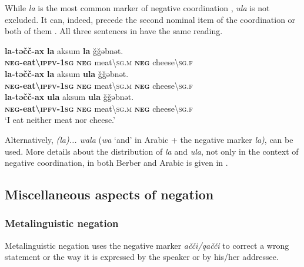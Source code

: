 \documentclass[output=paper,colorlinks,citecolor=brown]{langscibook}
\begin{document}
While \textit{la} is the most common marker of negative coordination , \textit{ula} is not excluded. It can, indeed, precede the second nominal item of the coordination  or both of them .
All three sentences in  have the same reading.

\ea\label{ex:siw:74}
    \ea\label{ex:siw:74a}
        \gll \textbf{la-təčč-ax} \textbf{la} aksum \textbf{la} ǧǧəbnət. \\ 
             \textbf{\textsc{neg}-eat{\textbackslash}\textsc{ipfv-1sg}} \textbf{\textsc{neg}} meat{\textbackslash}\textsc{sg.m} \textbf{\textsc{neg}} cheese{\textbackslash}\textsc{sg.f} \\
    \ex\label{ex:siw:74b}
        \gll \textbf{la-təčč-ax} \textbf{la} aksum \textbf{ula} ǧǧəbnət. \\
             \textbf{\textsc{neg}-eat{\textbackslash}\textsc{ipfv-1sg}} \textbf{\textsc{neg}} meat{\textbackslash}\textsc{sg.m} \textbf{\textsc{neg}} cheese{\textbackslash}\textsc{sg.f} \\
    \ex\label{ex:siw:74c}
        \gll \textbf{la-təčč-ax} \textbf{ula} aksum \textbf{ula} ǧǧəbnət. \\
             \textbf{\textsc{neg}-eat{\textbackslash}\textsc{ipfv-1sg}} \textbf{\textsc{neg}} meat{\textbackslash}\textsc{sg.m} \textbf{\textsc{neg}} cheese{\textbackslash}\textsc{sg.f} \\
        \glt ‘I eat neither meat nor cheese.’
    \z
\z 

Alternatively, \textit{(la)... wala} (\textit{wa} ‘and’ in Arabic + the negative marker \textit{la)}, can be used. More details about the distribution of \textit{la} and \textit{ula}, not only in the context of negative coordination, in both Berber and Arabic is given in .

\subsection{Miscellaneous aspects of negation}\label{sec:siw:4.6}
\subsubsection{Metalinguistic negation}\label{sec:siw:4.6.1}

Metalinguistic negation uses the negative marker \textit{ačči/qačči} to correct a wrong statement or the way it is expressed by the speaker or by his/her addressee.
\end{document}
